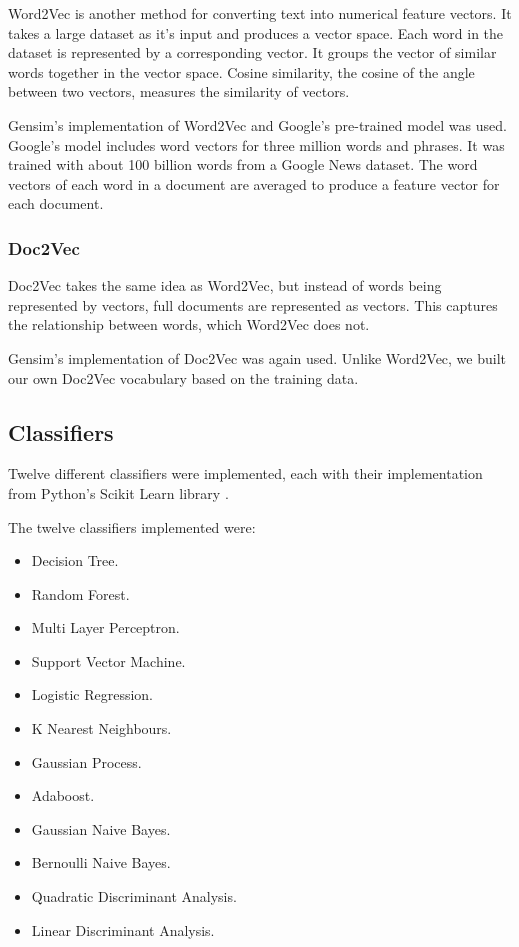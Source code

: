 Word2Vec is another method for converting text into numerical feature vectors. It takes a large dataset as it's input and produces a vector space. Each word in the dataset is represented by a corresponding vector. It groups the vector of similar words together in the vector space. Cosine similarity, the cosine of the angle between two vectors, measures the similarity of vectors. 

Gensim's implementation of Word2Vec and Google's pre-trained model was used. Google's model includes word vectors for three million words and phrases. It was trained with about 100 billion words from a Google News dataset. The word vectors of each word in a document are averaged to produce a feature vector for each document.

\subsubsection*{Doc2Vec}

Doc2Vec takes the same idea as Word2Vec, but instead of words being represented by vectors, full documents are represented as vectors. This captures the relationship between words, which Word2Vec does not.

Gensim's implementation of Doc2Vec was again used. Unlike Word2Vec, we built our own Doc2Vec vocabulary based on the training data.

\subsection*{Classifiers}

Twelve different classifiers were implemented, each with their implementation from Python's Scikit Learn library \cite{scikit-learn}.

The twelve classifiers implemented were:
\begin{itemize}
    \item Decision Tree.
    \item Random Forest.
    \item Multi Layer Perceptron.
    \item Support Vector Machine.
    \item Logistic Regression.
    \item K Nearest Neighbours.
    \item Gaussian Process.
    \item Adaboost.
    \item Gaussian Naive Bayes.
    \item Bernoulli Naive Bayes.
    \item Quadratic Discriminant Analysis.
    \item Linear Discriminant Analysis.
\end{itemize}

